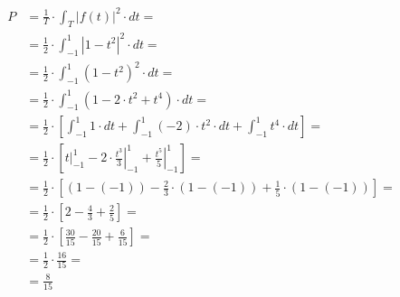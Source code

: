 \begin{task}
\begin{align*}
	P&=\frac{1}{T} \cdot \int_{T}\left|f(t)\right|^2 \cdot dt =\\
	&=\frac{1}{2} \cdot  \int_{-1}^{1}\left| 1-t^2 \right|^2 \cdot dt =\\
    &=\frac{1}{2} \cdot  \int_{-1}^{1}\left(1-t^2\right)^2 \cdot dt =\\
    &=\frac{1}{2} \cdot  \int_{-1}^{1}\left(1-2 \cdot t^2 + t^4\right) \cdot dt =\\
    &=\frac{1}{2} \cdot \left[ \int_{-1}^{1} 1 \cdot dt +\int_{-1}^{1} (-2) \cdot t^2 \cdot dt +\int_{-1}^{1} t^4 \cdot dt\right]=\\
    &=\frac{1}{2} \cdot \left[ \left. t \right|_{-1}^{1} -2 \cdot \left. \frac{t^3}{3}\right|_{-1}^{1} +\left. \frac{t^5}{5}\right|_{-1}^{1}\right]=\\
    &=\frac{1}{2} \cdot \left[ (1-(-1)) -\frac{2}{3} \cdot (1-(-1)) +\frac{1}{5} \cdot (1-(-1))\right]=\\
    &=\frac{1}{2} \cdot \left[ 2 -\frac{4}{3} +\frac{2}{5}\right]=\\
    &=\frac{1}{2} \cdot \left[ \frac{30}{15} -\frac{20}{15} +\frac{6}{15}\right]=\\
    &=\frac{1}{2} \cdot \frac{16}{15}=\\
    &=\frac{8}{15}\\
\end{align*}

\end{task}

